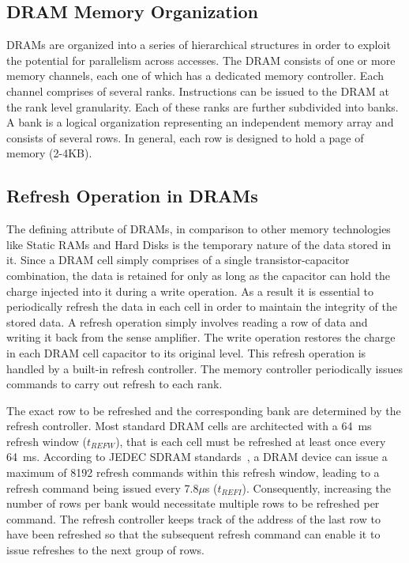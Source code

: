 \subsection{DRAM Memory Organization}

DRAMs are organized into a series of hierarchical structures in order to exploit the potential for parallelism across accesses. The DRAM consists of one or more memory channels, each one of which has a dedicated memory controller. Each channel comprises of several ranks. Instructions can be issued to the DRAM at the rank level granularity. Each of these ranks are further subdivided into banks. A bank is a logical organization representing an independent memory array and consists of several rows. In general, each row is designed to hold a page of memory (2-4KB).

\subsection{Refresh Operation in DRAMs}
The defining attribute of DRAMs, in comparison to other memory technologies like Static RAMs and Hard Disks is the temporary nature of the data stored in it. Since a DRAM cell simply comprises of a single transistor-capacitor combination, the data is retained for only as long as the capacitor can hold the charge injected into it during a write operation. As a result it is essential to periodically refresh the data in each cell in order to maintain the integrity of the stored data. A refresh operation simply involves reading a row of data and writing it back from the sense amplifier. The write operation restores the charge in each DRAM cell capacitor to its original level. This refresh operation is handled by a built-in refresh controller. The memory controller periodically issues commands to carry out refresh to each rank.

The exact row to be refreshed and the corresponding bank are determined by the refresh controller. Most standard DRAM cells are architected with a 64~ms refresh window ($t_{REFW}$), that is each cell must be refreshed at least once every 64~ms. According to JEDEC SDRAM standards~\cite{jedec-sdram-standards}, a DRAM device can issue a maximum of 8192 refresh commands within this refresh window, leading to a refresh command being issued every 7.8$\mu$s ($t_{REFI}$). Consequently, increasing the number of rows per bank would necessitate multiple rows to be refreshed per command. The refresh controller keeps track of the address of the last row to have been refreshed so that the subsequent refresh command can enable it to issue refreshes to the next group of rows.

